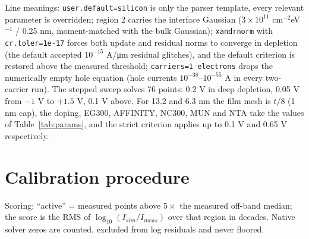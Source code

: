 \documentclass[11pt,a4paper]{article}
\newcommand{\Aum}{A/\si{\micro\metre}}
\begin{document}
Line meanings: \texttt{user.default=silicon} is only the parser template, every relevant parameter is overridden; region 2 carries the interface Gaussian ($3\times10^{11}$ cm$^{-2}$eV$^{-1}$ / 0.25 nm, moment-matched with the bulk Gaussian); \texttt{xandrnorm} with \texttt{cr.toler=1e-17} forces both update and residual norms to converge in depletion (the default accepted $10^{-15}$ \Aum{} residual glitches), and the default criterion is restored above the measured threshold; \texttt{carriers=1 electrons} drops the numerically empty hole equation (hole currents $10^{-38}$--$10^{-55}$ A in every two-carrier run). The stepped sweep solves 76 points: 0.2 V in deep depletion, 0.05 V from $-1$ V to $+1.5$ V, 0.1 V above. For 13.2 and 6.3 nm the film mesh is $t/8$ (1 nm cap), the doping, EG300, AFFINITY, NC300, MUN and NTA take the values of Table~\ref{tab:params}, and the strict criterion applies up to 0.1 V and 0.65 V respectively.

\section{Calibration procedure}\label{sec:calib}
Scoring: ``active'' = measured points above $5\times$ the measured off-band median; the score is the RMS of $\log_{10}(I_{sim}/I_{meas})$ over that region in decades. Native solver zeros are counted, excluded from log residuals and never floored.
\end{document}
